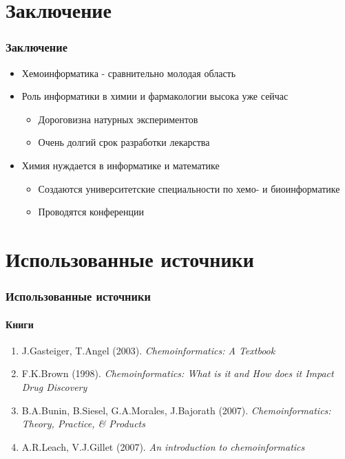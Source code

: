 \section*{Заключение}
\begin{frame}
  \frametitle{Заключение}
  \begin{itemize}
    \item Хемоинформатика - сравнительно молодая область
    \item Роль информатики в химии и фармакологии высока уже сейчас 
      \begin{itemize}
        \item Дороговизна натурных экспериментов
        \item Очень долгий срок разработки лекарства
      \end{itemize}
    \item Химия нуждается в информатике и математике
      \begin{itemize}
    \item Создаются университетские специальности по хемо- и биоинформатике
    \item Проводятся конференции
  \end{itemize}

  \end{itemize}
\end{frame}

\section*{Использованные источники}

\begin{frame}
  \frametitle{Использованные источники}
  \framesubtitle{Книги}
  \begin{enumerate}
    \item J.Gasteiger, T.Angel (2003). \emph{Chemoinformatics: A Textbook}     
    \item F.K.Brown (1998). \emph{Chemoinformatics: What is it and How does it Impact Drug Discovery}
    \item B.A.Bunin, B.Siesel, G.A.Morales, J.Bajorath (2007). \emph{Chemoinformatics: Theory, Practice, \& Products}
    \item A.R.Leach, V.J.Gillet (2007). \emph{An introduction to chemoinformatics}
  \end{enumerate}
\end{frame}

